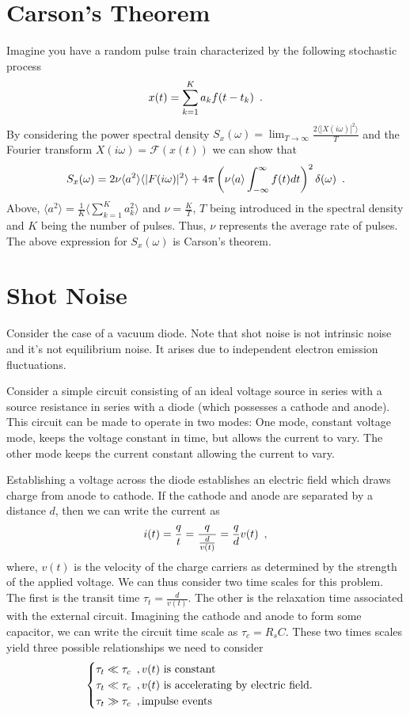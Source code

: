 \documentclass{article}
\begin{document}
\section{Carson's Theorem}
\label{sec:carson_s_theorem}
Imagine you have a random pulse train characterized by the following stochastic
process
\[
   x(t) = \sum^{K}_{k=1} a_{k}f(t-t_{k}) \enskip.
\]
By considering the power spectral density $ S_{x}(\omega) = \lim_{T \to \infty}
\frac{2 \langle |X(i \omega) |^2 \rangle}{T}$ and the Fourier transform $
X(i\omega) = \mathcal{F}(x(t)) $ we can show that
\[
   S_{x}(\omega) =2 \nu \langle a^{2} \rangle \langle |F(i\omega)|^{2} \rangle +
   4 \pi \left( \nu \langle a \rangle \int_{-\infty}^{\infty} f(t) dt
   \right)^{2} \delta(\omega) \enskip.
\]
Above, $ \langle a^{2} \rangle = \frac{1}{K} \langle \sum^{K}_{k=1}  a_{k}^{2}
   \rangle $ and $ \nu = \frac{K}{T} $, $ T $ being introduced in the spectral
   density and $ K $ being the number of pulses. Thus, $ \nu $ represents the
   average rate of pulses. The above expression for $ S_{x}(\omega) $ is
   Carson's theorem.

\section{Shot Noise}
\label{sec:shot_noise}
Consider the case of a vacuum diode. Note that shot noise is not intrinsic noise
and it's not equilibrium noise. It arises due to independent electron emission
fluctuations.

Consider a simple circuit consisting of an ideal voltage source in series with a
source resistance in series with a diode (which possesses a cathode and anode).
This circuit can be made to operate in two modes: One mode, constant voltage
mode, keeps the voltage constant in time, but allows the current to vary. The
other mode keeps the current constant allowing the current to vary.

Establishing a voltage across the diode establishes an electric field which
draws charge from anode to cathode. If the cathode and anode are separated by a
distance $ d $, then we can write the current as
\[
   i(t) = \frac{q}{t} = \frac{q}{\frac{d}{v(t)}} = \frac{q}{d} v(t) \enskip,
\]
where, $ v(t) $ is the velocity of the charge carriers as determined by the
strength of the applied voltage. We can thus consider two time scales for this
problem. The first is the transit time $ \tau_{t} = \frac{d}{v(t)} $. The other
is the relaxation time associated with the external circuit. Imagining the
cathode and anode to form some capacitor, we can write the circuit time scale as
$ \tau_{c} = R_{s}C $. These two times scales yield three possible relationships
we need to consider
\begin{equation*}
\begin{cases}
   \tau_{t} \ll \tau_{c} \enskip,\text{$ v(t) $ is constant} \\
   \tau_{t} \ll \tau_{c} \enskip,\text{$ v(t) $ is accelerating by electric
   field.} \\
   \tau_{t} \gg \tau_{c} \enskip,\text{impulse events}
\end{cases}
\end{equation*}
\end{document}
